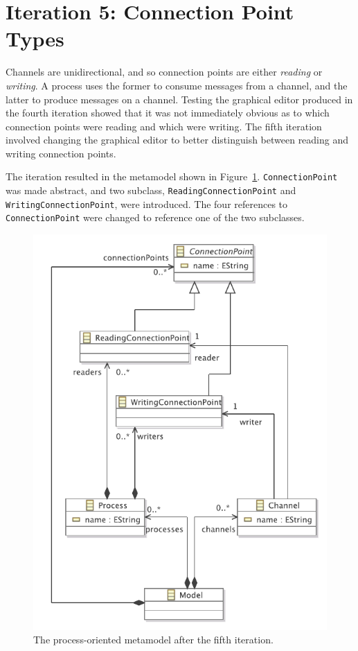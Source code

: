 \clearpage

\section{Iteration 5: Connection Point Types}
\label{sec:po_it5}
Channels are unidirectional, and so connection points are either \emph{reading} or \emph{writing}. A process uses the former to consume messages from a channel, and the latter to produce messages on a channel. Testing the graphical editor produced in the fourth iteration showed that it was not immediately obvious as to which connection points were reading and which were writing. The fifth iteration involved changing the graphical editor to better distinguish between reading and writing connection points.

The iteration resulted in the metamodel shown in Figure~\ref{fig:po_it5_mm}. \texttt{Co\-nn\-ec\-ti\-o\-nP\-oi\-nt} was made abstract, and two subclass, \texttt{Re\-a\-di\-ngCo\-nn\-ec\-ti\-o\-nP\-oi\-nt} and \texttt{Wr\-i\-ti\-ngCo\-nn\-ec\-ti\-o\-nP\-oi\-nt}, were introduced. The four references to \texttt{Co\-nn\-ec\-ti\-o\-nP\-oi\-nt} were changed to reference one of the two subclasses.

\begin{figure}[htbp]
	\centering
		\includegraphics[scale=0.75]{A.2.ProcessOriented/images/5_mm.pdf}
	\caption{The process-oriented metamodel after the fifth iteration.}
	\label{fig:po_it5_mm}
\end{figure}

